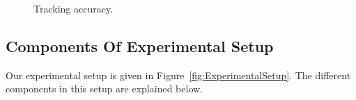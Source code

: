 \documentclass{article}
\begin{document}
\begin{itemize}
			\begin{figure}%
				\centering
				
					
				\caption{Tracking accuracy.} 		
				
			\end{figure}



\subsection{Components Of Experimental Setup}
Our experimental setup is given in Figure~\ref{fig:ExperimentalSetup}.  The different components in this setup are explained below.


			\begin{figure}[t]
				\centering
				

\end{figure}
\end{itemize}
\end{document}
